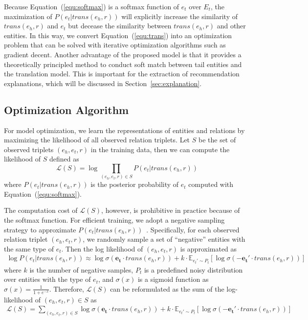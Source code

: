 \documentclass[algorithms,article,accept,moreauthors,pdftex,10pt,a4paper]{Definitions/mdpi}
\begin{document}
Because Equation~(\ref{equ:softmax}) is a softmax function of $e_t$ over $E_t$, the maximization of $P(e_t | trans(e_h, r))$ will explicitly increase the similarity of $trans(e_h, r)$ and $e_t$ but decease the similarity between $trans(e_h, r)$ and other entities. 
In this way, we convert Equation~(\ref{equ:trans}) into an optimization problem that can be solved with iterative optimization algorithms such as gradient decent.
Another advantage of the proposed model is that it provides a theoretically principled method to conduct soft match between tail entities and the translation model. 
This is important for the extraction of recommendation explanations, which will be discussed in Section~\ref{sec:explanation}.

\subsection{Optimization Algorithm}

For model optimization, we learn the representations of entities and relations by maximizing the likelihood of all observed relation triplets. 
Let $S$ be the set of observed triplets $(e_h, e_t, r)$ in the training data, then we can compute the likelihood of $S$ defined as
\begin{equation}
\mathcal{L}(S) = \log\!\!\!\!\prod_{(e_h, e_t, r) \in S}\!\!\!\! P(e_t | trans(e_h, r))
\label{equ:log_likelihood}
\end{equation}
where $P(e_t | trans(e_h, r))$ is the posterior probability of $e_t$ computed with Equation~(\ref{equ:softmax}).

The computation cost of $\mathcal{L}(S)$, however, is prohibitive in practice because of the softmax function.
For efficient training, we adopt a negative sampling strategy to approximate $P(e_t | trans(e_h, r))$~\cite{mikolov2013efficient}.
Specifically, for each observed relation triplet $(e_h, e_t, r)$, we randomly sample a set of ``negative'' entities with the same type of $e_t$. Then the log likelihood of $(e_h, e_t, r)$ is approximated as
\begin{equation}
\begin{split}
\log P(e_t | trans(e_h, r)) \approx \log \sigma(\bm{e_t} \cdot trans(e_h, r)) + k\cdot \mathbb{E}_{e_t'\sim P_t}[\log\sigma(-\bm{e_t'} \cdot trans(e_h, r))]
\end{split}
\label{equ:negative_sample}
\end{equation}
where $k$ is the number of negative samples, $P_t$ is a predefined noisy distribution over entities with the type of $e_t$, and $\sigma(x)$ is a sigmoid function as $\sigma(x) = \frac{1}{1 + e^{-x}}$.
Therefore, $\mathcal{L}(S)$ can be reformulated as the sum of the log-likelihood of $(e_h, e_t, r)\in S$ as
\begin{equation}
\begin{split}
\mathcal{L}(S) = \!\!\!\!\sum_{(e_h, e_t, r) \in S}\!\!\!\! \log \sigma(\bm{e_t} \cdot trans(e_h, r)) +k\cdot \mathbb{E}_{e_t'\sim P_t}[\log\sigma(-\bm{e_t'} \cdot trans(e_h, r))]
\end{split}
\label{equ:final_loss}
\end{equation}
\end{document}
